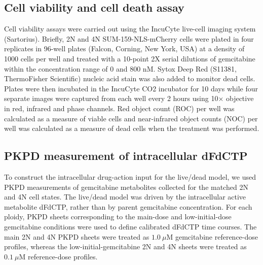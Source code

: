 \documentclass[11pt,notitlepage]{article}
\begin{document}






\subsection*{Cell viability and cell death assay}
Cell viability assays were carried out using the IncuCyte live-cell imaging system (Sartorius). Briefly, 2N and 4N SUM-159-NLS-mCherry cells were plated in four replicates in 96-well plates (Falcon, Corning, New York, USA) at a density of 1000 cells per well and treated with a 10-point 2X serial dilutions of gemcitabine within the concentration range of 0 and 800 nM. Sytox Deep Red (S11381, ThermoFisher Scientific) nucleic acid stain was also added to monitor dead cells. Plates were then incubated in the IncuCyte CO2 incubator for 10 days while four separate images were captured from each well every 2 hours using 10× objective in red, infrared and phase channels. Red object count (ROC) per well was calculated as a measure of viable cells and near-infrared object counts (NOC) per well was calculated as a measure of dead cells when the treatment was performed.

\subsection*{PKPD measurement of intracellular dFdCTP}
To construct the intracellular drug-action input for the live/dead model, we used PKPD measurements of gemcitabine metabolites collected for the matched 2N and 4N cell states. The live/dead model was driven by the intracellular active metabolite dFdCTP, rather than by parent gemcitabine concentration. For each ploidy, PKPD sheets corresponding to the main-dose and low-initial-dose gemcitabine conditions were used to define calibrated dFdCTP time courses. The main 2N and 4N PKPD sheets were treated as \(1.0~\mu\mathrm{M}\) gemcitabine reference-dose profiles, whereas the low-initial-gemcitabine 2N and 4N sheets were treated as \(0.1~\mu\mathrm{M}\) reference-dose profiles.
\end{document}

